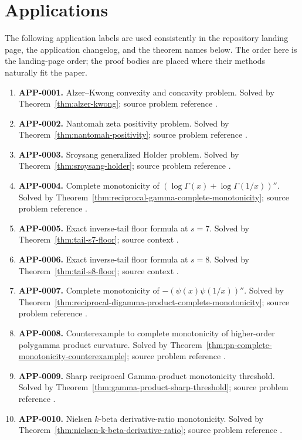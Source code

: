 \documentclass[11pt]{article}
\numberwithin{equation}{section}
\theoremstyle{definition}
\theoremstyle{remark}
\newcommand{\1}{\mathbf 1}
\begin{document}
\section{Applications}
\label{sec:applications}

The following application labels are used consistently in the repository landing page, the application changelog, and the theorem names below.  The order here is the landing-page order; the proof bodies are placed where their methods naturally fit the paper.

\begin{enumerate}
\item \textbf{APP-0001.} Alzer--Kwong convexity and concavity problem.  Solved by Theorem~\ref{thm:alzer-kwong}; source problem reference \cite{alzer-kwong}.
\item \textbf{APP-0002.} Nantomah zeta positivity problem.  Solved by Theorem~\ref{thm:nantomah-positivity}; source problem reference \cite{nantomah}.
\item \textbf{APP-0003.} Sroysang generalized Holder problem.  Solved by Theorem~\ref{thm:sroysang-holder}; source problem reference \cite{sroysang}.
\item \textbf{APP-0004.} Complete monotonicity of \((\log\Gamma(x)+\log\Gamma(1/x))''\).  Solved by Theorem~\ref{thm:reciprocal-gamma-complete-monotonicity}; source problem reference \cite{qi-lim-nantomah-polygamma}.
\item \textbf{APP-0005.} Exact inverse-tail floor formula at \(s=7\).  Solved by Theorem~\ref{thm:tail-s7-floor}; source context \cite{kim-song-tail,pan-wu-tail}.
\item \textbf{APP-0006.} Exact inverse-tail floor formula at \(s=8\).  Solved by Theorem~\ref{thm:tail-s8-floor}; source context \cite{kim-song-tail,pan-wu-tail}.
\item \textbf{APP-0007.} Complete monotonicity of \(-(\psi(x)\psi(1/x))''\).  Solved by Theorem~\ref{thm:reciprocal-digamma-product-complete-monotonicity}; source problem reference \cite{qi-lim-nantomah-polygamma}.
\item \textbf{APP-0008.} Counterexample to complete monotonicity of higher-order polygamma product curvature.  Solved by Theorem~\ref{thm:pn-complete-monotonicity-counterexample}; source problem reference \cite{qi-lim-nantomah-polygamma}.
\item \textbf{APP-0009.} Sharp reciprocal Gamma-product monotonicity threshold.  Solved by Theorem~\ref{thm:gamma-product-sharp-threshold}; source problem reference \cite{bulboaca-zayed-gamma}.
\item \textbf{APP-0010.} Nielsen \(k\)-beta derivative-ratio monotonicity.  Solved by Theorem~\ref{thm:nielsen-k-beta-derivative-ratio}; source problem reference \cite{yin-zhang-k-beta}.
\end{enumerate}
\end{document}
